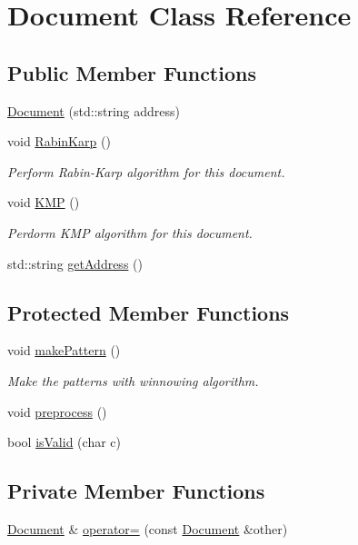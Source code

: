 \hypertarget{class_document}{}\section{Document Class Reference}
\label{class_document}
\subsection*{Public Member Functions}
\begin{DoxyCompactItemize}
\item 
\hyperlink{class_document_ad6f3eb7808d3d6ad6f40e5b64a3317bc}{Document} (std\+::string address)
\item 
void \hyperlink{class_document_a607bc11ebda64c08fd22c8ca7aa373d3}{Rabin\+Karp} ()
\begin{DoxyCompactList}\small\item\em Perform Rabin-\/\+Karp algorithm for this document. \end{DoxyCompactList}\item 
void \hyperlink{class_document_aa02349519b475996d1206dfbbcaab349}{K\+MP} ()
\begin{DoxyCompactList}\small\item\em Perdorm K\+MP algorithm for this document. \end{DoxyCompactList}\item 
std\+::string \hyperlink{class_document_aba3c51ac1b4cb63dd9235aaa9e5ab6f0}{get\+Address} ()
\end{DoxyCompactItemize}
\subsection*{Protected Member Functions}
\begin{DoxyCompactItemize}
\item 
void \hyperlink{class_document_a019a44be44bd7b548ea32e4c699bed49}{make\+Pattern} ()
\begin{DoxyCompactList}\small\item\em Make the patterns with winnowing algorithm. \end{DoxyCompactList}\item 
void \hyperlink{class_document_a508bc7255ec6ddf96d0d7078ff0d1229}{preprocess} ()
\item 
bool \hyperlink{class_document_ae81119fe62cb6c73bff4c9283c97884f}{is\+Valid} (char c)
\end{DoxyCompactItemize}
\subsection*{Private Member Functions}
\begin{DoxyCompactItemize}
\item 
\hyperlink{class_document}{Document} \& \hyperlink{class_document_a4ccdb9185bd311793ad385564553153c}{operator=} (const \hyperlink{class_document}{Document} \&other)
\end{DoxyCompactItemize}
